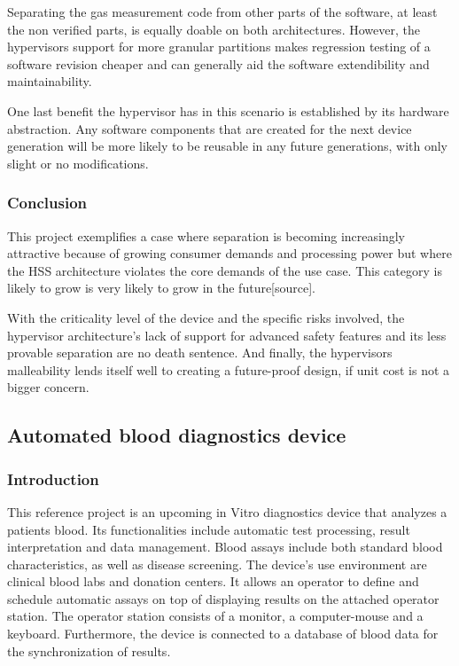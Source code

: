 Separating the gas measurement code from other parts of the software, at least the non verified parts, is equally doable on both architectures. However, the hypervisors support for more granular partitions makes regression testing of a software revision cheaper and can generally aid the software extendibility and maintainability.

One last benefit the hypervisor has in this scenario is established by its hardware abstraction. Any software components that are created for the next device generation will be more likely to be reusable in any future generations, with only slight or no modifications.
\subsubsection{Conclusion}
This project exemplifies a case where separation is becoming increasingly attractive because of growing consumer demands and processing power but where the \gls{HSS} architecture violates the core demands of the use case. This category is likely to grow is very likely to grow in the future[source].

With the criticality level of the device and the specific risks involved, the hypervisor architecture's lack of support for advanced safety features and its less provable separation are no death sentence. And finally, the hypervisors malleability lends itself well to creating a future-proof design, if unit cost is not a bigger concern. 
\subsection{Automated blood diagnostics device}
\subsubsection{Introduction}
This reference project is an upcoming in Vitro diagnostics device that analyzes a patients blood. Its functionalities include automatic test processing, result interpretation and data management. Blood assays include both standard blood characteristics, as well as disease screening.
The device's use environment are clinical blood labs and donation centers. It allows an operator to define and schedule automatic assays on top of displaying results on the attached operator station. The operator station consists of a monitor, a computer-mouse and a keyboard. Furthermore, the device is connected to a database of blood data for the synchronization of results.

